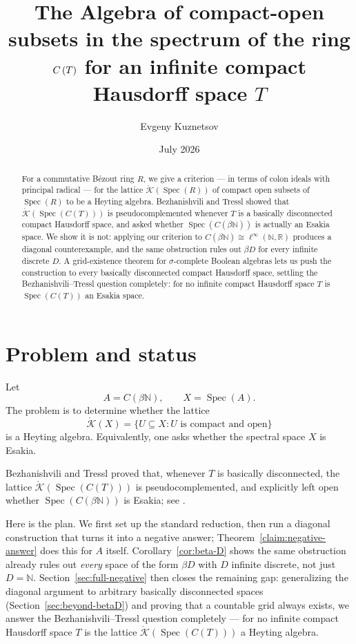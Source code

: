 \documentclass{amsart}
\title[Compact-open subsets in the spectrum of $\cont{T}$]{The Algebra of compact-open subsets in the spectrum
of the ring $\cont{T}$ for an infinite compact Hausdorff space $T$}
\author{Evgeny Kuznetsov}
\date{July 2026}
\theoremstyle{definition}
\theoremstyle{remark}
\newcommand{\Spec}[1]{\operatorname{Spec}\left(#1\right)}
\newcommand{\nat}{\mathbb N}
\newcommand{\reals}{\mathbb R}
\newcommand{\cont}[1]{C\left(#1\right)}
\newcommand{\KOp}[1]{\mathring{\mathcal{K}}\left(#1\right)}
\newcommand{\linfty}{\ell^\infty}
\begin{document}
\begin{abstract}
For a commutative B\'ezout ring $R$, we give a criterion --- in terms of
colon ideals with principal radical --- for the lattice $\KOp{\Spec R}$
of compact open subsets of $\Spec R$ to be a Heyting algebra.
Bezhanishvili and Tressl showed that $\KOp{\Spec{\cont T}}$ is
pseudocomplemented whenever $T$ is a basically disconnected compact
Hausdorff space, and asked whether $\Spec{\cont{\beta\nat}}$ is actually
an Esakia space. We show it is not: applying our criterion to
$\cont{\beta\nat}\cong\linfty(\nat,\reals)$ produces a diagonal
counterexample, and the same obstruction rules out $\beta D$ for every
infinite discrete $D$. A grid-existence theorem for $\sigma$-complete
Boolean algebras lets us push the construction to every basically
disconnected compact Hausdorff space, settling the Bezhanishvili--Tressl
question completely: for no infinite compact Hausdorff space $T$ is
$\Spec{\cont T}$ an Esakia space.
\end{abstract}


\maketitle

\section{Problem and status}
\label{sec:problem}

Let
\[
A=\cont{\beta\nat},
\qquad
X=\Spec{A}.
\]
The problem is to determine whether the lattice
\[
\KOp{X}=\{U\subseteq X:U\text{ is compact and open}\}
\]
is a Heyting algebra. Equivalently, one asks whether the spectral space
$X$ is Esakia.

Bezhanishvili and Tressl proved that, whenever $T$ is basically
disconnected, the lattice $\KOp{\Spec{\cont{T}}}$ is pseudocomplemented,
and explicitly left open whether $\Spec{\cont{\beta\nat}}$
is Esakia; see \cite{bezhanishvili-tressl-2026}.

Here is the plan. We first set up the standard reduction, then run a
diagonal construction that turns it into a negative answer;
Theorem~\ref{claim:negative-answer} does this for $A$ itself.
Corollary~\ref{cor:beta-D} shows the same obstruction already rules out
\emph{every} space of the form $\beta D$ with $D$ infinite discrete, not
just $D=\nat$. Section~\ref{sec:full-negative} then closes the remaining
gap: generalizing the diagonal argument to arbitrary basically
disconnected spaces (Section~\ref{sec:beyond-betaD}) and proving that a
countable grid always exists, we answer the Bezhanishvili--Tressl
question completely --- for no infinite compact Hausdorff space $T$ is
the lattice $\KOp{\Spec{\cont{T}}}$ a Heyting algebra.
\end{document}
